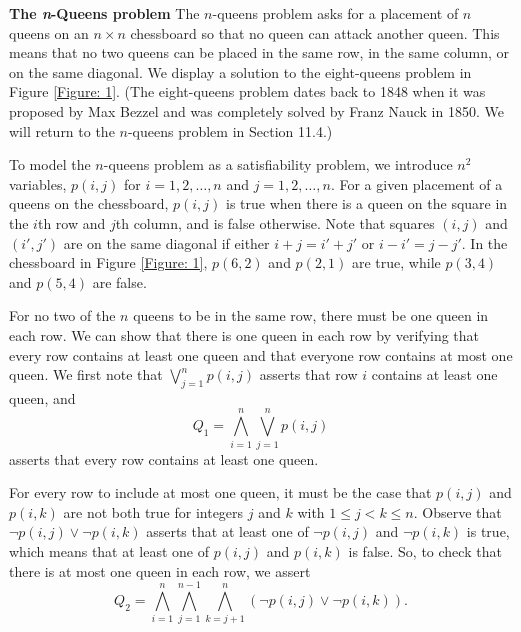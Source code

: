 \documentclass{Axon}
\begin{document}
\begin{example}\label{Example: 10}
    \textbf{The \textit{n}-Queens problem}
    The \(n\)-queens problem asks for a placement of \(n\) queens on an \(n \times n\) chessboard so that no queen can attack another queen. This means that no two queens can be placed in the same row, in the same column, or on the same diagonal. We display a solution to the eight-queens problem in Figure \ref{Figure: 1}. (The eight-queens problem dates back to 1848 when it was proposed by Max Bezzel and was completely solved by Franz Nauck in 1850. We will return to the \(n\)-queens problem in Section 11.4.)

    To model the \(n\)-queens problem as a satisfiability problem, we introduce \(n^2\) variables, \(p(i, j)\) for \(i = 1, 2, \ldots, n\) and \(j = 1, 2, \ldots, n\). For a given placement of a queens on the chessboard, \(p(i, j)\) is true when there is a queen on the square in the \(i\)th row and \(j\)th column, and is false otherwise. Note that squares \((i, j)\) and \((i', j')\) are on the same diagonal if either \(i + j = i' + j'\) or \(i - i' = j - j'\). In the chessboard in Figure \ref{Figure: 1}, \(p(6, 2)\) and \(p(2, 1)\) are true, while \(p(3, 4)\) and \(p(5, 4)\) are false.

    For no two of the \(n\) queens to be in the same row, there must be one queen in each row. We can show that there is one queen in each row by verifying that every row contains at least one queen and that everyone row contains at most one queen. We first note that \(\bigvee_{j = 1} ^ n p(i, j)\) asserts that row \(i\) contains at least one queen, and
    \begin{equation*}
        Q_1 = \bigwedge_{i = 1}^n \bigvee_{j = 1}^n p(i, j)
    \end{equation*}
    asserts that every row contains at least one queen.

    For every row to include at most one queen, it must be the case that \(p(i, j)\) and \(p(i, k)\) are not both true for integers \(j\) and \(k\) with \(1 \leq j < k \leq n\). Observe that \(\lnot p(i, j) \lor \lnot p(i, k)\) asserts that at least one of \(\lnot p(i, j)\) and \(\lnot p(i, k)\) is true, which means that at least one of \(p(i, j)\) and \(p(i, k)\) is false. So, to check that there is at most one queen in each row, we assert
    \begin{equation*}
        Q_2 = \bigwedge_{i = 1}^n \bigwedge_{j = 1}^{n - 1} \bigwedge_{k = j + 1}^n (\lnot p(i, j) \lor \lnot p(i, k)).
    \end{equation*}


\end{example}
\end{document}
